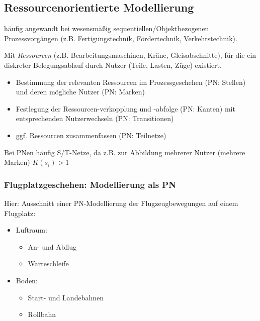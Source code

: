 \subsection{Ressourcenorientierte Modellierung}
häufig angewandt bei wesensmäßig sequentiellen/Objektbezogenen Prozessvorgängen (z.B. Fertigungstechnik, Fördertechnik, Verkehrstechnik).

Mit \textit{Ressourcen} (z.B. Bearbeitungsmaschinen, Kräne, Gleisabschnitte), für die ein diskreter Belegungsablauf durch Nutzer (Teile, Lasten, Züge) existiert.

\begin{itemize}
	\item Bestimmung der relevanten Ressourcen im Prozessgeschehen (PN: Stellen) und deren mögliche Nutzer (PN: Marken)
	\item Festlegung der Ressourcen-verkopplung und -abfolge (PN: Kanten) mit entsprechenden Nutzerwechseln (PN: Transitionen)
	\item ggf. Ressourcen zusammenfassen (PN: Teilnetze) 
\end{itemize}

Bei PNen häufig S/T-Netze, da z.B. zur Abbildung mehrerer Nutzer (mehrere Marken) $K(s_i)>1$

\subsubsection{Flugplatzgeschehen: Modellierung als PN}
Hier: Ausschnitt einer PN-Modellierung der Flugzeugbewegungen auf einem Flugplatz:

\begin{itemize}
	\item Luftraum:\\
	\begin{itemize}
		\item An- und Abflug
		\item Warteschleife
	\end{itemize}
	
	\item Boden:\\
	\begin{itemize}
		\item Start- und Landebahnen
		\item Rollbahn
	\end{itemize}
\end{itemize}


